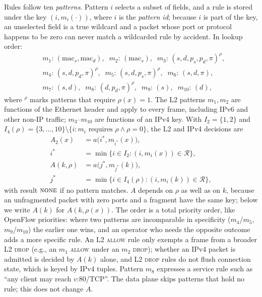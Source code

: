 \documentclass[conference]{IEEEtran}
\begin{document}
Rules follow ten \emph{patterns}. Pattern $i$ selects a subset of fields, and a
rule is stored under the key $(i, m_i(\cdot))$, where $i$ is the
\emph{pattern id}; because $i$ is part of the key, an unselected field is a
true wildcard and a packet whose port or protocol happens to be zero can never
match a wildcarded rule by accident. In lookup order:
\begin{equation}
\begin{aligned}
&m_1{:}\,(\mathrm{mac}_s,\mathrm{mac}_d),\;\; m_2{:}\,(\mathrm{mac}_s),\;\;
 m_3{:}\,(s,d,p_s,p_d,\pi)^{\rho},\\
&m_4{:}\,(s,d,p_d,\pi)^{\rho},\;\; m_5{:}\,(s,d,p_s,\pi)^{\rho},\;\;
 m_6{:}\,(s,d,\pi),\\
&m_7{:}\,(s,d),\;\; m_8{:}\,(d,p_d,\pi)^{\rho},\;\; m_9{:}\,(s),\;\;
 m_{10}{:}\,(d),
\end{aligned}
\label{eq:patterns}
\end{equation}
where $^{\rho}$ marks patterns that require $\rho(x)=1$. The L2 patterns
$m_1,m_2$ are functions of the Ethernet header and apply to every frame,
including IPv6 and other non-IP traffic; $m_3$--$m_{10}$ are functions of an
IPv4 key. With $I_2=\{1,2\}$ and $I_4(\rho)=\{3,\dots,10\}\setminus\{i: m_i
\text{ requires } \rho \land \rho=0\}$, the L2 and IPv4 decisions are
\begin{equation}
\begin{aligned}
A_2(x) &= a\big(i^*, m_{i^*}(x)\big),\\
i^* &= \min\{i \in I_2 : (i, m_i(x)) \in \mathcal{R}\},\\
A(k,\rho) &= a\big(j^*, m_{j^*}(k)\big),\\
j^* &= \min\{i \in I_4(\rho) : (i, m_i(k)) \in \mathcal{R}\},
\end{aligned}
\label{eq:match}
\end{equation}
with result $\textsc{none}$ if no pattern matches. $A$ depends on $\rho$
as well as on $k$, because an unfragmented packet with zero ports and a
fragment have the same key; below we write $A(k)$ for $A(k,\rho(x))$. The order is a total
priority order, like OpenFlow priorities: where two patterns are incomparable
in specificity ($m_4$/$m_5$, $m_9$/$m_{10}$) the earlier one wins, and an
operator who needs the opposite outcome adds a more specific rule. An L2
\textsc{allow} rule only exempts a frame from a broader L2 \textsc{drop}
(e.g., an $m_1$ \textsc{allow} under an $m_2$ \textsc{drop}); whether an IPv4
packet is admitted is decided by $A(k)$ alone, and L2 \textsc{drop} rules
do not flush connection state, which is keyed by IPv4 tuples. Pattern $m_8$ expresses a
service rule such as ``any client may reach $v$:80/TCP''. The data plane skips
patterns that hold no rule; this does not change $A$.
\end{document}
